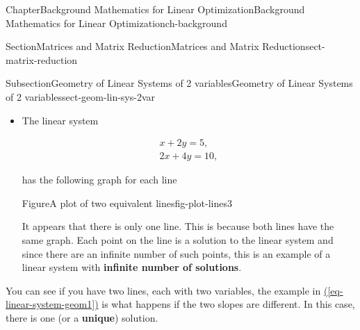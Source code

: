 \documentclass[oneside,10pt,]{book}
\newcommand{\xreffont}{\relax}
\newcommand{\terminology}[1]{\textbf{#1}}
\numberwithin{equation}{section}
\begin{document}
\begin{chapterptx}{Chapter}{Background Mathematics for Linear Optimization}{}{Background Mathematics for Linear Optimization}{}{}{ch-background}
\begin{sectionptx}{Section}{Matrices and Matrix Reduction}{}{Matrices and Matrix Reduction}{}{}{sect-matrix-reduction}
\begin{subsectionptx}{Subsection}{Geometry of Linear Systems of 2 variables}{}{Geometry of Linear Systems of 2 variables}{}{}{sect-geom-lin-sys-2var}
\begin{itemize}[label=\textbullet]
\begin{figureptx}{Figure}{Plot of two parallel lines}{fig-plot-lines-2}{}
\begin{image}{0.125}{0.75}{0.125}{}
{}%
\end{image}%
\tcblower
\end{figureptx}%
As you can see, it doesn't appear that the lines cross anywhere. In fact, they don't because the lines are parallel. This is an example of a linear system with \terminology{no solution}.%
\item{}The linear system%
\par
%
\begin{equation}
\begin{aligned} x + 2 y = 5, \\ 2x + 4 y = 10, \end{aligned}\label{eq-linear-system-geom3}
\end{equation}
%
\par
has the following graph for each line%
\begin{figureptx}{Figure}{A plot of two equivalent lines}{fig-plot-lines3}{}%
\begin{image}{0.125}{0.75}{0.125}{}%
%
\end{image}%
\tcblower
\end{figureptx}%
It appears that there is only one line. This is because both lines have the same graph. Each point on the line is a solution to the linear system and since there are an infinite number of such points, this is an example of a linear system with \terminology{infinite number of solutions}.%
\end{itemize}
%
\par
You can see if you have two lines, each with two variables, the example in \hyperref[eq-linear-system-geom1]{({\xreffont\ref{eq-linear-system-geom1}})} is what happens if the two slopes are different. In this case, there is one (or a \terminology{unique}) solution.%
\par

\end{subsectionptx}
\end{sectionptx}
\end{chapterptx}
\end{document}
